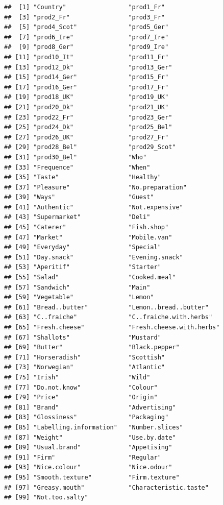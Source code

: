 \documentclass[
]{book}
\begin{document}
\begin{verbatim}
##  [1] "Country"                 "prod1_Fr"               
##  [3] "prod2_Fr"                "prod3_Fr"               
##  [5] "prod4_Scot"              "prod5_Ger"              
##  [7] "prod6_Ire"               "prod7_Ire"              
##  [9] "prod8_Ger"               "prod9_Ire"              
## [11] "prod10_It"               "prod11_Fr"              
## [13] "prod12_Dk"               "prod13_Ger"             
## [15] "prod14_Ger"              "prod15_Fr"              
## [17] "prod16_Ger"              "prod17_Fr"              
## [19] "prod18_UK"               "prod19_UK"              
## [21] "prod20_Dk"               "prod21_UK"              
## [23] "prod22_Fr"               "prod23_Ger"             
## [25] "prod24_Dk"               "prod25_Bel"             
## [27] "prod26_UK"               "prod27_Fr"              
## [29] "prod28_Bel"              "prod29_Scot"            
## [31] "prod30_Bel"              "Who"                    
## [33] "Frequence"               "When"                   
## [35] "Taste"                   "Healthy"                
## [37] "Pleasure"                "No.preparation"         
## [39] "Ways"                    "Guest"                  
## [41] "Authentic"               "Not.expensive"          
## [43] "Supermarket"             "Deli"                   
## [45] "Caterer"                 "Fish.shop"              
## [47] "Market"                  "Mobile.van"             
## [49] "Everyday"                "Special"                
## [51] "Day.snack"               "Evening.snack"          
## [53] "Aperitif"                "Starter"                
## [55] "Salad"                   "Cooked.meal"            
## [57] "Sandwich"                "Main"                   
## [59] "Vegetable"               "Lemon"                  
## [61] "Bread..butter"           "Lemon..bread..butter"   
## [63] "C..fraiche"              "C..fraiche.with.herbs"  
## [65] "Fresh.cheese"            "Fresh.cheese.with.herbs"
## [67] "Shallots"                "Mustard"                
## [69] "Butter"                  "Black.pepper"           
## [71] "Horseradish"             "Scottish"               
## [73] "Norwegian"               "Atlantic"               
## [75] "Irish"                   "Wild"                   
## [77] "Do.not.know"             "Colour"                 
## [79] "Price"                   "Origin"                 
## [81] "Brand"                   "Advertising"            
## [83] "Glossiness"              "Packaging"              
## [85] "Labelling.information"   "Number.slices"          
## [87] "Weight"                  "Use.by.date"            
## [89] "Usual.brand"             "Appetising"             
## [91] "Firm"                    "Regular"                
## [93] "Nice.colour"             "Nice.odour"             
## [95] "Smooth.texture"          "Firm.texture"           
## [97] "Greasy.mouth"            "Characteristic.taste"   
## [99] "Not.too.salty"
\end{verbatim}
\end{document}

